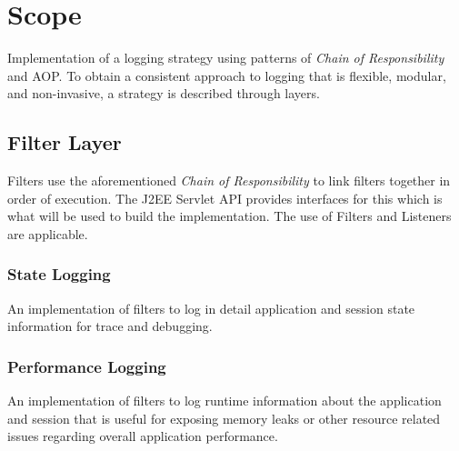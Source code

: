 \documentclass[12pt]{report}
\author{Leo Przybylski}
\begin{document}
\maketitle
\tableofcontents


\section{Scope}
Implementation of a logging strategy using patterns of \emph{Chain of Responsibility} and AOP. To obtain a
consistent approach to logging that is flexible, modular, and non-invasive, a strategy
is described through layers.

\subsection{Filter Layer}
Filters use the aforementioned \emph{Chain of Responsibility} to link filters together in order of execution. The J2EE
Servlet API provides interfaces for this which is what will be used to build the implementation. The use of Filters and 
Listeners are applicable.

\subsubsection{State Logging}
An implementation of filters to log in detail application and session state information for trace and debugging.

\subsubsection{Performance Logging}
An implementation of filters to log runtime information about the application and session that is useful for exposing
memory leaks or other resource related issues regarding overall application performance.
\end{document}

